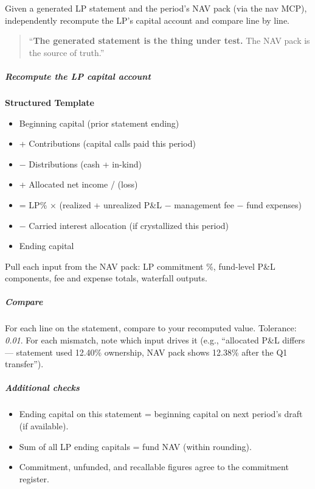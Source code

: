 \documentclass[11pt]{article}
\begin{document}
Given a generated LP statement and the period's NAV pack (via the nav MCP), independently recompute the LP's capital account and compare line by line.


\begin{quote}
``\textbf{The generated statement is the thing under test.} The NAV pack is the source of truth.''
\end{quote}

\subparagraph{Recompute the LP capital account}\mbox{}\par

\textbf{Structured Template}
\begin{itemize}[leftmargin=*,itemsep=2pt,topsep=2pt]
\item {} Beginning capital (prior statement ending)
\item {} + Contributions (capital calls paid this period)
\item {} − Distributions (cash + in-kind)
\item {} + Allocated net income / (loss)
\item {} = LP\% × (realized + unrealized P\&L − management fee − fund expenses)
\item {} − Carried interest allocation (if crystallized this period)
\item {} Ending capital
\end{itemize}

Pull each input from the NAV pack: LP commitment \%, fund-level P\&L components, fee and expense totals, waterfall outputs.


\subparagraph{Compare}\mbox{}\par

For each line on the statement, compare to your recomputed value. Tolerance: \emph{0.01}. For each mismatch, note which input drives it (e.g., ``allocated P\&L differs — statement used 12.40\% ownership, NAV pack shows 12.38\% after the Q1 transfer'').


\subparagraph{Additional checks}\mbox{}\par

\begin{itemize}[leftmargin=*,itemsep=2pt,topsep=2pt]
\item {} Ending capital on this statement = beginning capital on next period's draft (if available).
\item {} Sum of all LP ending capitals = fund NAV (within rounding).
\item {} Commitment, unfunded, and recallable figures agree to the commitment register.
\end{itemize}
\end{document}
